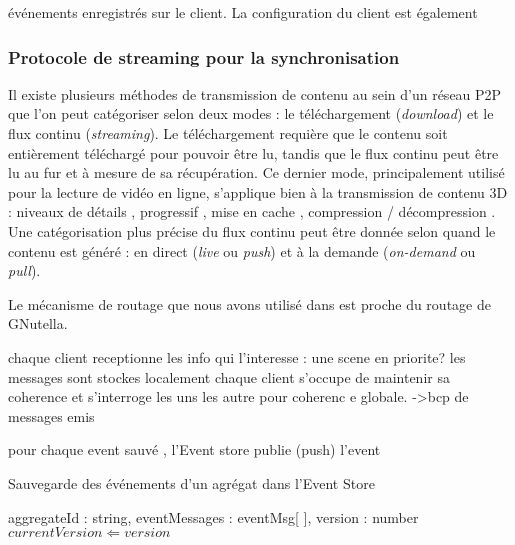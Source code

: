 événements enregistrés sur le client. La configuration du client est également 


\subsubsection{Protocole de streaming pour la synchronisation}
\label{streamingprotocol}

Il existe plusieurs méthodes de transmission de contenu au sein d'un réseau 
\gls{P2P} que l'on peut catégoriser selon deux modes : le téléchargement 
(\textit{download}) 
et le flux continu (\textit{streaming}). Le téléchargement requière que le contenu 
soit entièrement téléchargé pour pouvoir être lu, tandis que le flux continu peut 
être lu au fur et à mesure de sa récupération. Ce dernier mode, principalement 
utilisé pour la lecture de vidéo en ligne, s'applique bien à la transmission de 
contenu \gls{3D} : niveaux de détails \cite{Chu2012,Hu2008}, progressif 
\cite{Cheng2009,Limper2014}, mise en cache \cite{Jia2014}, compression / 
décompression
\cite{Lavoue2013,Ponchio2015,Maglo2013a}. 
Une catégorisation plus précise du flux continu peut être donnée selon quand le 
contenu est généré : 
en direct (\textit{live} ou \textit{push}) et à la demande (\textit{on-demand} ou 
\textit{pull}).  


Le mécanisme de routage que nous avons utilisé dans \cite{Desprat2015a} est 
proche du routage de GNutella. 


chaque client receptionne les info qui l’interesse : une scene en priorite?
les messages sont stockes localement
chaque client s’occupe de maintenir sa coherence
et s’interroge les uns les autre pour coherenc e globale.
->bcp de messages emis


pour chaque event sauvé , l’Event store publie (push) l’event

\begin{algorithm} %
	\caption{Sauvegarde des événements d'un agrégat dans l'Event Store} %
	\label{algo:saveEvent} %
	\begin{algorithmic} %
		\REQUIRE aggregateId : string, eventMessages : eventMsg[ ], 
		version : number
		\STATE $currentVersion \Leftarrow version$
		\ENDFOR
	\end{algorithmic}
\end{algorithm}

